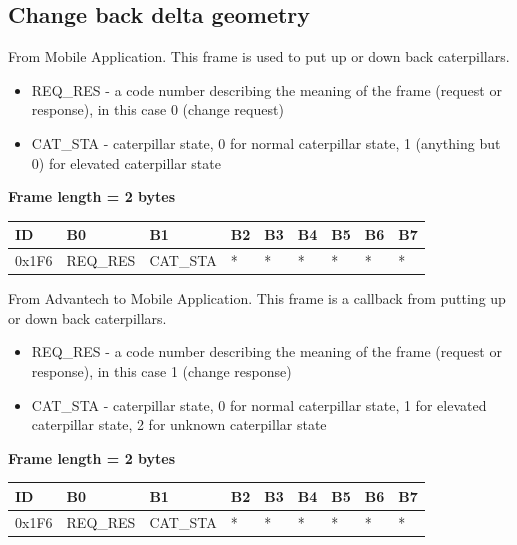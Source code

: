 \documentclass{article}
\begin{document}
\subsection{Change back delta geometry}
From Mobile Application. This frame is used to put up or down back caterpillars.

\begin{itemize}
    \item REQ\_RES - a code number describing the meaning of the frame (request or response), in this case 0 (change request)
    \item CAT\_STA - caterpillar state, 0 for normal caterpillar state, 1 (anything but 0) for elevated caterpillar state
\end{itemize}{}

\textbf{Frame length = 2 bytes}
\begin{center}
    \begin{tabular}{| p{20pt} | p{40pt} | p{40pt} | p{40pt} | p{40pt} | p{40pt} | p{40pt} | p{40pt} | p{40pt} |}
        \hline
        ID   & B0   & B1 & B2 & B3 & B4 & B5 & B6 & B7 \\
        \hline
        0x1F6 & REQ\_RES & CAT\_STA  & *  & *  & *  & *  & *  & *  \\
        \hline
    \end{tabular}
\end{center}

From Advantech to Mobile Application. This frame is a callback from putting up or down back caterpillars.

\begin{itemize}
    \item REQ\_RES - a code number describing the meaning of the frame (request or response), in this case 1 (change response)
    \item CAT\_STA - caterpillar state, 0 for normal caterpillar state, 1 for elevated caterpillar state, 2 for unknown caterpillar state
\end{itemize}{}

\textbf{Frame length = 2 bytes}
\begin{center}
    \begin{tabular}{| p{20pt} | p{40pt} | p{40pt} | p{40pt} | p{40pt} | p{40pt} | p{40pt} | p{40pt} | p{40pt} |}
        \hline
        ID   & B0   & B1 & B2 & B3 & B4 & B5 & B6 & B7 \\
        \hline
        0x1F6 & REQ\_RES & CAT\_STA  & *  & *  & *  & *  & *  & *  \\
        \hline
    \end{tabular}
\end{center}
\end{document}

